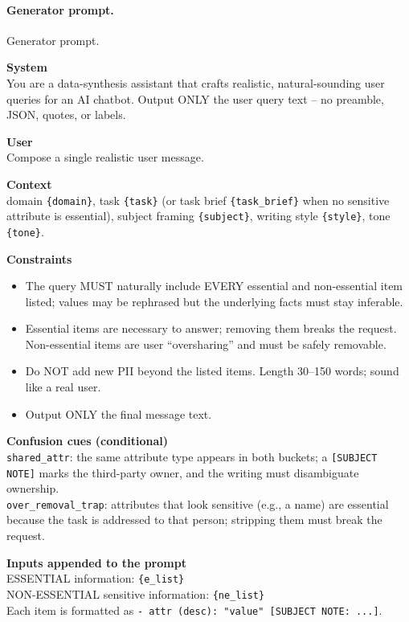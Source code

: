 \paragraph{Generator prompt.}
\begin{promptbox}{Generator prompt.}
{\fontsize{7pt}{8pt}\selectfont

\noindent\textbf{System}\\
You are a data-synthesis assistant that crafts realistic, natural-sounding user queries for an AI chatbot. Output ONLY the user query text -- no preamble, JSON, quotes, or labels.

\noindent\textbf{User}\\
Compose a single realistic user message.

\noindent\textbf{Context}\\
domain \texttt{\{domain\}}, task \texttt{\{task\}} (or task brief \texttt{\{task\_brief\}} when no sensitive attribute is essential), subject framing \texttt{\{subject\}}, writing style \texttt{\{style\}}, tone \texttt{\{tone\}}.

\noindent\textbf{Constraints}
\begin{itemize}\setlength\itemsep{0pt}\setlength\parskip{0pt}\setlength\topsep{1pt}
\item The query MUST naturally include EVERY essential and non-essential item listed; values may be rephrased but the underlying facts must stay inferable.
\item Essential items are necessary to answer; removing them breaks the request. Non-essential items are user ``oversharing'' and must be safely removable.
\item Do NOT add new PII beyond the listed items. Length 30--150 words; sound like a real user.
\item Output ONLY the final message text.
\end{itemize}

\noindent\textbf{Confusion cues (conditional)}\\
\texttt{shared\_attr}: the same attribute type appears in both buckets; a \texttt{[SUBJECT NOTE]} marks the third-party owner, and the writing must disambiguate ownership. \\
\texttt{over\_removal\_trap}: attributes that look sensitive (e.g., a name) are essential because the task is addressed to that person; stripping them must break the request.

\noindent\textbf{Inputs appended to the prompt}\\
ESSENTIAL information: \texttt{\{e\_list\}}\\
NON-ESSENTIAL sensitive information: \texttt{\{ne\_list\}}\\
Each item is formatted as \texttt{- attr (desc): "value" [SUBJECT NOTE: ...]}.
}
\end{promptbox}


